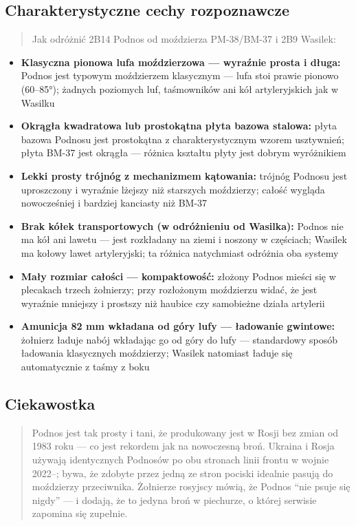 \documentclass[12pt,oneside]{book}
\providecommand{\tightlist}{%
  \setlength{\itemsep}{0pt}\setlength{\parskip}{0pt}}
\begin{document}
\subsection{Charakterystyczne cechy
rozpoznawcze}\label{charakterystyczne-cechy-rozpoznawcze-35}

\begin{quote}
Jak odróżnić 2B14 Podnos od moździerza PM-38/BM-37 i 2B9 Wasilek:
\end{quote}

\begin{itemize}
\tightlist
\item
  \textbf{Klasyczna pionowa lufa moździerzowa --- wyraźnie prosta i
  długa:} Podnos jest typowym moździerzem klasycznym --- lufa stoi
  prawie pionowo (60--85°); żadnych poziomych luf, taśmowników ani kół
  artyleryjskich jak w Wasilku
\item
  \textbf{Okrągła kwadratowa lub prostokątna płyta bazowa stalowa:}
  płyta bazowa Podnosu jest prostokątna z charakterystycznym wzorem
  usztywnień; płyta BM-37 jest okrągła --- różnica kształtu płyty jest
  dobrym wyróżnikiem
\item
  \textbf{Lekki prosty trójnóg z mechanizmem kątowania:} trójnóg Podnosu
  jest uproszczony i wyraźnie lżejszy niż starszych moździerzy; całość
  wygląda nowocześ­niej i bardziej kanciasty niż BM-37
\item
  \textbf{Brak kółek transportowych (w odróżnieniu od Wasilka):} Podnos
  nie ma kół ani lawetu --- jest rozkładany na ziemi i noszony w
  częściach; Wasilek ma kołowy lawet artyleryjski; ta różnica
  natychmiast odróżnia oba systemy
\item
  \textbf{Mały rozmiar całości --- kompaktowość:} złożony Podnos mieści
  się w plecakach trzech żołnierzy; przy rozłożonym moździerzu widać, że
  jest wyraźnie mniejszy i prostszy niż haubice czy samobieżne działa
  artylerii
\item
  \textbf{Amunicja 82 mm wkładana od góry lufy --- ładowanie gwintowe:}
  żołnierz ładuje nabój wkładając go od góry do lufy --- standardowy
  sposób ładowania klasycznych moździerzy; Wasilek natomiast ładuje się
  automatycznie z taśmy z boku
\end{itemize}

\subsection{Ciekawostka}\label{ciekawostka-35}

\begin{quote}
Podnos jest tak prosty i tani, że produkowany jest w Rosji bez zmian od
1983 roku --- co jest rekordem jak na nowoczesną broń. Ukraina i Rosja
używają identycznych Podnosów po obu stronach linii frontu w wojnie
2022--; bywa, że zdobyte przez jedną ze stron pociski idealnie pasują do
moździerzy przeciwnika. Żołnierze rosyjscy mówią, że Podnos ``nie psuje
się nigdy'' --- i dodają, że to jedyna broń w piechurze, o której
serwisie zapomina się zupełnie.
\end{quote}
\end{document}
